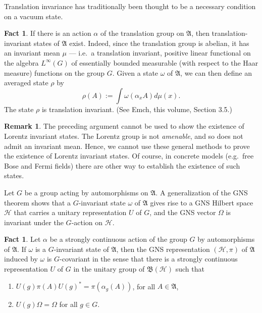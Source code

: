 \documentclass[11pt]{article}
\newcommand{\alg}[1]{\mathfrak{#1}}
\newcommand{\bh}{\mathfrak{B}(\mathcal{H})}
\theoremstyle{definition}
\newtheorem{fact}[thm]{Fact}
\theoremstyle{definition}
\newtheorem{note}[thm]{Remark}
\theoremstyle{remark}
\def\2#1{{\mathcal #1}}
\def\al#1{{\mathfrak #1}}
\def\a{\alpha} \def\b{\beta} \def\g{\gamma} \def\d{\delta}
\def\om{\omega} \def\Om{\Omega} \def\dd{\partial} \def\D{\Delta}
\begin{document}
Translation invariance has traditionally been thought to be a necessary condition on
a vacuum state.

\begin{fact} If there is an action $\a$ of the translation group on
  $\al A$, then translation-invariant states of $\al A$ exist.
  Indeed, since the translation group is abelian, it has an invariant
  mean $\mu$ --- i.e.\ a translation invariant, positive linear
  functional on the algebra $L^{\infty}(G)$ of essentially bounded
  measurable (with respect to the Haar measure) functions on the group
  $G$.  Given a state $\om$ of $\al A$, we can then define an averaged
  state $\rho$ by
$$ \rho (A):=\int \om (\a _xA)d\mu (x) .$$ 
The state $\rho$ is translation invariant.  (See Emch,
this volume, Section 3.5.)
\end{fact}

\begin{note} The preceding argument cannot be used to show the
  existence of Lorentz invariant states.  The Lorentz group is not
  \emph{amenable}, and so does not admit an invariant mean.  Hence, we
  cannot use these general methods to prove the existence of Lorentz
  invariant states.  Of course, in concrete models (e.g.\ free Bose
  and Fermi fields) there are other way to establish the existence of
  such states.
\end{note}


Let $G$ be a group acting by automorphisms on $\alg{A}$.  A
generalization of the GNS theorem shows that a $G$-invariant state
$\om$ of $\alg{A}$ gives rise to a GNS Hilbert space $\2H$ that
carries a unitary representation $U$ of $G$, and the GNS vector $\Om$
is invariant under the $G$-action on $\2H$.

\begin{fact} Let $\a$ be a strongly continuous action of the group $G$
  by automorphisms of $\alg{A}$.  If $\om$ is a $G$-invariant state of
  $\alg{A}$, then the GNS representation $(\2H ,\pi )$ of $\alg{A}$
  induced by $\om$ is $G$-covariant in the sense that there is a
  strongly continuous representation $U$ of $G$ in the unitary group
  of $\bh$ such that
  \begin{enumerate}
  \item $U(g)\pi (A)U(g)^* =\pi (\a _g(A))$, for all $A\in \alg{A}$,
  \item $U(g)\Om =\Om$ for all $g\in G$.
\end{enumerate} \label{unitary}
\end{fact}
\end{document}
